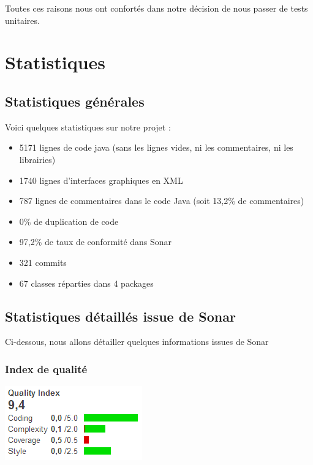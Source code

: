 \documentclass{report}
\begin{document}
Toutes ces raisons nous ont confortés dans notre décision de nous passer
de tests unitaires.

\newpage

\section{Statistiques}
\bigskip


\subsection{Statistiques générales}
\bigskip


Voici quelques statistiques sur notre projet :
\begin{itemize}
\item 5171 lignes de code java (sans les lignes vides, ni les
commentaires, ni les librairies)
\item 1740 lignes d’interfaces graphiques en XML
\item 787 lignes de commentaires dans le code Java (soit 13,2\% de
commentaires)
\item 0\% de duplication de code
\item 97,2\% de taux de conformité dans Sonar
\item 321 commits
\item 67 classes réparties dans 4 packages
\end{itemize}

\subsection{Statistiques détaillés issue de Sonar}
\bigskip


Ci-dessous, nous allons détailler quelques informations issues de Sonar

\subsubsection{Index de qualité}


\begin{center}
\includegraphics{images/quality_index}
\end{center}
\end{document}
